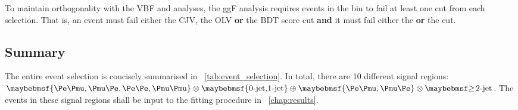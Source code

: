 To maintain orthogonality with the VBF and \VH analyses, the ggF analysis requires events 
in the \twojet bin to fail at least one cut from each selection. That is, an event must 
fail either the CJV, the OLV \textbf{or} the BDT score cut \textbf{and} it must fail 
either the \dyjj \textbf{or} the \mjj cut.



\subsection{Summary}
\label{sec:selection:summary}

The entire event selection is concisely summarised in \Table~\ref{tab:event_selection}. 
In total, there are 10 different signal regions: $\braces{\emch,\mech,\eech,\mmch} 
\otimes \braces{\text{0-jet,1-jet}} \oplus \braces{\emch,\mech} \otimes \twojet$. The 
events in these signal regions shall be input to the fitting procedure in 
\Chapter~\ref{chap:results}.

